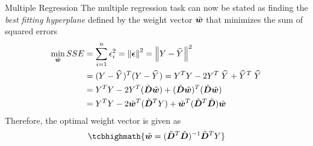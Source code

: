 %
\begin{frame}{Multiple Regression}
The multiple regression task can now be stated as finding the {\em best fitting hyperplane} defined
by the weight vector $\abw$ that 
minimizes the sum of squared errors
\begin{align}
    \min_{\abw} SSE & = \sum_{i=1}^{n} \epsilon_i^2 =
    \norm{\bepsilon}^2 = \norm{Y - \hY}^2 \notag\\
    & = (Y -\hY)^T (Y - \hY) = Y^T Y - 2 Y^T\; \hY +
    \hY^T\; \hY\notag\\
    & = Y^T Y -2 Y^T (\abD \abw) + (\abD \abw)^T (\abD \abw)\notag\\
    & = Y^T Y - 2 \abw^T (\abD^T Y) + \abw^T (\abD^T \abD) \abw
\end{align}
%
Therefore, the optimal weight vector is given as
\begin{align}
    \tcbhighmath{
    \abw = (\abD^T \abD)^{-1} \abD^T Y}
\end{align}
\end{frame}
%
